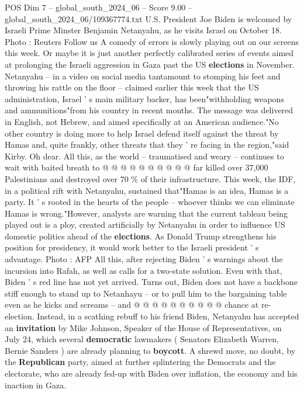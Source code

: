\begin{textsample}{POS Dim 7 – global\_south\_2024\_06 – Score 9.00 – global\_south\_2024\_06/109367774.txt}  \label{ex:f7_pos_237}
U.S.
President Joe Biden is welcomed by Israeli Prime Minster Benjamin Netanyahu, as he visits Israel on October 18.
Photo : Reuters Follow us A comedy of errors is slowly playing out on our screens this week.
Or maybe it is just another perfectly calibrated series of events aimed at prolonging the Israeli aggression in Gaza past the US \textbf{elections} in November.
Netanyahu -- in a video on social media tantamount to stomping his feet and throwing his rattle on the floor -- claimed earlier this week that the US administration, Israel ' s main military backer, has been"withholding weapons and ammunitions"from his country in recent months.
The message was delivered in English, not Hebrew, and aimed specifically at an American audience."No other country is doing more to help Israel defend itself against the threat by Hamas and, quite frankly, other threats that they ' re facing in the region,"said Kirby.
Oh dear.
All this, as the world -- traumatised and weary -- continues to wait with baited breath to @ @ @ @ @ @ @ @ @ @ far killed over 37,000 Palestinians and destroyed over 70 \% of their infrastructure.
This week, the IDF, in a political rift with Netanyahu, sustained that"Hamas is an idea, Hamas is a party.
It ' s rooted in the hearts of the people -- whoever thinks we can eliminate Hamas is wrong."However, analysts are warning that the current tableau being played out is a ploy, created artificially by Netanyahu in order to influence US domestic politics ahead of the \textbf{elections}.
As Donald Trump strengthens his position for presidency, it would work better to the Israeli president ' s advantage.
Photo : AFP All this, after rejecting Biden ' s warnings about the incursion into Rafah, as well as calls for a two-state solution.
Even with that, Biden ' s red line has not yet arrived.
Turns out, Biden does not have a backbone stiff enough to stand up to Netanhayu -- or to pull him to the bargaining table even as he kicks and screams -- and @ @ @ @ @ @ @ @ @ @ chance at re-election.
Instead, in a scathing rebuff to his friend Biden, Netanyahu has accepted an \textbf{invitation} by Mike Johnson, Speaker of the House of Representatives, on July 24, which several \textbf{democratic} lawmakers ( Senators Elizabeth Warren, Bernie Sanders ) are already planning to \textbf{boycott}.
A shrewd move, no doubt, by the \textbf{Republican} party, aimed at further splintering the Democrats and the electorate, who are already fed-up with Biden over inflation, the economy and his inaction in Gaza.

\end{textsample}
